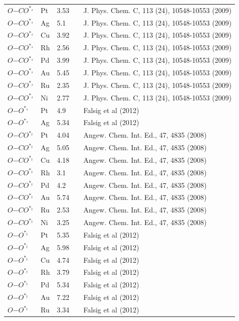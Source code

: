 \documentclass[a4paper,8pt]{report}
\begin{document}
\begin{longtable}{lllll}
$O\mathrm{-}CO^{*_s}$& Pt& 3.53& & \parbox[t]{4cm}{J. Phys. Chem. C, 113 (24), 10548-10553 (2009)}\\
$O\mathrm{-}CO^{*_s}$& Ag& 5.1& & \parbox[t]{4cm}{J. Phys. Chem. C, 113 (24), 10548-10553 (2009)}\\
$O\mathrm{-}CO^{*_s}$& Cu& 3.92& & \parbox[t]{4cm}{J. Phys. Chem. C, 113 (24), 10548-10553 (2009)}\\
$O\mathrm{-}CO^{*_s}$& Rh& 2.56& & \parbox[t]{4cm}{J. Phys. Chem. C, 113 (24), 10548-10553 (2009)}\\
$O\mathrm{-}CO^{*_s}$& Pd& 3.99& & \parbox[t]{4cm}{J. Phys. Chem. C, 113 (24), 10548-10553 (2009)}\\
$O\mathrm{-}CO^{*_s}$& Au& 5.45& & \parbox[t]{4cm}{J. Phys. Chem. C, 113 (24), 10548-10553 (2009)}\\
$O\mathrm{-}CO^{*_s}$& Ru& 2.35& & \parbox[t]{4cm}{J. Phys. Chem. C, 113 (24), 10548-10553 (2009)}\\
$O\mathrm{-}CO^{*_s}$& Ni& 2.77& & \parbox[t]{4cm}{J. Phys. Chem. C, 113 (24), 10548-10553 (2009)}\\
$O\mathrm{-}O^{*_s}$& Pt& 4.9& & \parbox[t]{4cm}{Falsig et al (2012)}\\
$O\mathrm{-}O^{*_s}$& Ag& 5.34& & \parbox[t]{4cm}{Falsig et al (2012)}\\
$O\mathrm{-}CO^{*_t}$& Pt& 4.04& & \parbox[t]{4cm}{Angew. Chem. Int. Ed., 47, 4835 (2008)}\\
$O\mathrm{-}CO^{*_t}$& Ag& 5.05& & \parbox[t]{4cm}{Angew. Chem. Int. Ed., 47, 4835 (2008)}\\
$O\mathrm{-}CO^{*_t}$& Cu& 4.18& & \parbox[t]{4cm}{Angew. Chem. Int. Ed., 47, 4835 (2008)}\\
$O\mathrm{-}CO^{*_t}$& Rh& 3.1& & \parbox[t]{4cm}{Angew. Chem. Int. Ed., 47, 4835 (2008)}\\
$O\mathrm{-}CO^{*_t}$& Pd& 4.2& & \parbox[t]{4cm}{Angew. Chem. Int. Ed., 47, 4835 (2008)}\\
$O\mathrm{-}CO^{*_t}$& Au& 5.74& & \parbox[t]{4cm}{Angew. Chem. Int. Ed., 47, 4835 (2008)}\\
$O\mathrm{-}CO^{*_t}$& Ru& 2.53& & \parbox[t]{4cm}{Angew. Chem. Int. Ed., 47, 4835 (2008)}\\
$O\mathrm{-}CO^{*_t}$& Ni& 3.25& & \parbox[t]{4cm}{Angew. Chem. Int. Ed., 47, 4835 (2008)}\\
$O\mathrm{-}O^{*_t}$& Pt& 5.35& & \parbox[t]{4cm}{Falsig et al (2012)}\\
$O\mathrm{-}O^{*_t}$& Ag& 5.98& & \parbox[t]{4cm}{Falsig et al (2012)}\\
$O\mathrm{-}O^{*_t}$& Cu& 4.74& & \parbox[t]{4cm}{Falsig et al (2012)}\\
$O\mathrm{-}O^{*_t}$& Rh& 3.79& & \parbox[t]{4cm}{Falsig et al (2012)}\\
$O\mathrm{-}O^{*_t}$& Pd& 5.34& & \parbox[t]{4cm}{Falsig et al (2012)}\\
$O\mathrm{-}O^{*_t}$& Au& 7.22& & \parbox[t]{4cm}{Falsig et al (2012)}\\
$O\mathrm{-}O^{*_t}$& Ru& 3.34& & \parbox[t]{4cm}{Falsig et al (2012)}\\


\bottomrule
\end{longtable}
\end{document}
